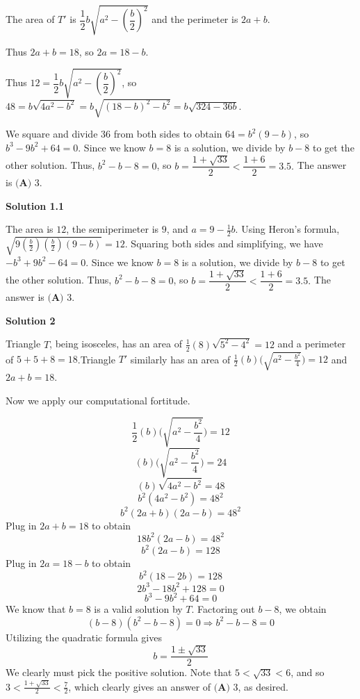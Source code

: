 \begin{enumerate}
 The area of $T'$ is $\dfrac{1}{2} b \sqrt{a^2 - (\dfrac{b}{2})^2}$ and the perimeter is $2a + b$.

 Thus $2a + b = 18$, so $2a = 18 - b$.

 Thus $12 = \dfrac{1}{2} b \sqrt{a^2 - (\dfrac{b}{2})^2}$, so $48 = b \sqrt{4a^2 - b^2} = b \sqrt{(18 - b)^2 - b^2} = b \sqrt{324 - 36b}$.

 We square and divide 36 from both sides to obtain $64 = b^2 (9 - b)$, so $b^3 - 9b^2 + 64 = 0$. Since we know $b = 8$ is a solution, we divide by $b - 8$ to get the other solution. Thus, $b^2 - b - 8 = 0$, so $b = \dfrac{1 + \sqrt{33}}{2} < \dfrac{1 + 6}{2} = 3.5.$ The answer is $\boxed{\textbf{(A) }3}$.

 



\textbf{Solution 1.1}

The area is $12$, the semiperimeter is $9$, and $a = 9 - \frac12b$. Using Heron's formula, $\sqrt{9\left(\frac{b}{2}\right)\left(\frac{b}{2}\right)(9-b)} = 12$. Squaring both sides and simplifying, we have $-b^3+9b^2-64=0$. Since we know $b = 8$ is a solution, we divide by $b - 8$ to get the other solution. Thus, $b^2 - b - 8 = 0$, so $b = \dfrac{1 + \sqrt{33}}{2} < \dfrac{1 + 6}{2} = 3.5.$ The answer is $\boxed{\textbf{(A) }3}$.

 



\textbf{Solution 2}

Triangle $T$, being isosceles, has an area of $\frac{1}{2}(8)\sqrt{5^2-4^2}=12$ and a perimeter of $5+5+8=18$.Triangle $T'$ similarly has an area of $\frac{1}{2}(b)\bigg(\sqrt{a^2-\frac{b^2}{4}}\bigg)=12$ and $2a+b=18$.

 Now we apply our computational fortitude.

 
 \[\frac{1}{2}(b)\bigg(\sqrt{a^2-\frac{b^2}{4}}\bigg)=12\]
 \[(b)\bigg(\sqrt{a^2-\frac{b^2}{4}}\bigg)=24\]
 \[(b)\sqrt{4a^2-b^2}=48\]
 \[b^2(4a^2-b^2)=48^2\]
 \[b^2(2a+b)(2a-b)=48^2\]Plug in $2a+b=18$ to obtain
 \[18b^2(2a-b)=48^2\]
 \[b^2(2a-b)=128\]Plug in $2a=18-b$ to obtain
 \[b^2(18-2b)=128\]
 \[2b^3-18b^2+128=0\]
 \[b^3-9b^2+64=0\]We know that $b=8$ is a valid solution by $T$. Factoring out $b-8$, we obtain
 \[(b-8)(b^2-b-8)=0 \Rightarrow b^2-b-8=0\]Utilizing the quadratic formula gives
 \[b=\frac{1\pm\sqrt{33}}{2}\]We clearly must pick the positive solution. Note that $5<\sqrt{33}<6$, and so ${3<\frac{1+\sqrt{33}}{2}<\frac{7}{2}}$, which clearly gives an answer of $\boxed{\textbf{(A) }3}$, as desired.


\end{enumerate}
